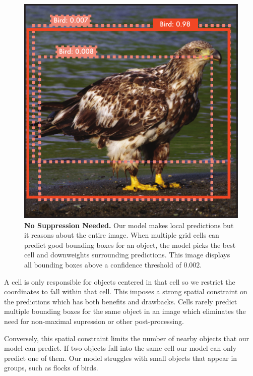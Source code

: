 \documentclass{article} %
\begin{document}

\begin{figure}[h]
\begin{center}
        \includegraphics[width=.9\linewidth]{eagle}
\end{center}
   \caption{\textbf{No Suppression Needed.} Our model makes local predictions but it reasons about the entire image. When multiple grid cells can predict good bounding boxes for an object, the model picks the best cell and downweights surrounding predictions. This image displays all bounding boxes above a confidence threshold of $0.002$.}
\label{eagle}
\end{figure}

A cell is only responsible for objects centered in that cell so we restrict the coordinates to fall within that cell. This imposes a strong spatial constraint on the predictions which has both benefits and drawbacks. Cells rarely predict multiple bounding boxes for the same object in an image which eliminates the need for non-maximal supression or other post-processing.

Conversely, this spatial constraint limits the number of nearby objects that our model can predict. If two objects fall into the same cell our model can only predict one of them. Our model struggles with small objects that appear in groups, such as flocks of birds.
\end{document}
